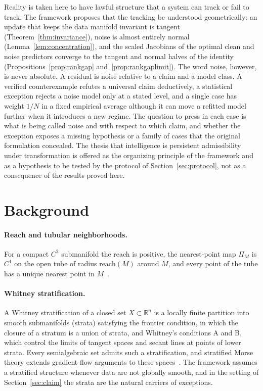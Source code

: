 \documentclass[11pt,a4paper]{article}
\theoremstyle{definition}
\theoremstyle{remark}
\newcommand{\R}{\mathbb{R}}
\newcommand{\reach}{\mathrm{reach}}
\begin{document}
Reality is taken here to have lawful structure that a system can track or
fail to track. The framework proposes that the tracking be understood
geometrically: an update that keeps the data manifold invariant is tangent
(Theorem~\ref{thm:invariance}), noise is almost entirely normal
(Lemma~\ref{lem:concentration}), and the scaled Jacobians of the optimal clean and noise predictors converge to the tangent and normal halves of the identity (Propositions~\ref{prop:rankgap} and~\ref{prop:rankgaplimit}).
The word noise, however, is never absolute. A residual is noise relative to a claim and a model class. A verified counterexample refutes a universal claim deductively, a statistical exception rejects a noise model only at a stated level, and a single case has weight $1/N$ in a fixed empirical average although it can move a refitted model further when it introduces a new regime. The question to press
in each case is what is being called noise and with respect to which claim,
and whether the exception exposes a missing hypothesis or a family of cases
that the original formulation concealed. The thesis that intelligence is
persistent admissibility under transformation is offered as the organizing
principle of the framework and as a hypothesis to be tested by the
protocol of Section~\ref{sec:protocol}, not as a consequence of the results proved
here.

\appendix

\section{Background}\label{app:background}

\paragraph{Reach and tubular neighborhoods.} For a compact $C^2$ submanifold the
reach is positive, the nearest-point map $\Pi_M$ is $C^1$ on the open tube of
radius $\reach(M)$ around $M$, and every point of the tube has a unique
nearest point in $M$~\cite{federer1959curvature,lee2013smooth}.

\paragraph{Whitney stratification.} A Whitney stratification of a closed set
$X\subset\R^n$ is a locally finite partition into smooth submanifolds (strata)
satisfying the frontier condition, in which the closure of a stratum is a union
of strata, and Whitney's conditions A and B, which control the limits of
tangent spaces and secant lines at points of lower strata. Every
semialgebraic set admits such a stratification, and stratified Morse
theory extends gradient-flow arguments to these spaces~\cite{goresky1988stratified}. The
framework assumes a stratified structure whenever data are not globally smooth,
and in the setting of Section~\ref{sec:claim} the strata are the natural
carriers of exceptions.
\end{document}
